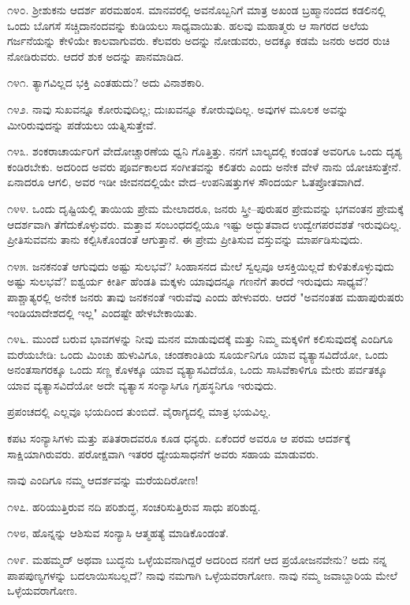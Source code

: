 ೧೪೦. ಶ‍್ರೀಶುಕನು ಆದರ್ಶ ಪರಮಹಂಸ. ಮಾನವರಲ್ಲಿ ಅವನೊಬ್ಬನಿಗೆ ಮಾತ್ರ ಅಖಂಡ ಬ್ರಹ್ಮಾನಂದದ ಕಡಲಿನಲ್ಲಿ ಒಂದು ಬೊಗಸೆ ಸಚ್ಚಿದಾನಂದವನ್ನು ಕುಡಿಯಲು ಸಾಧ್ಯವಾಯಿತು. ಹಲವು ಮಹಾತ್ಮರು ಆ ಸಾಗರದ ಅಲೆಯ ಗರ್ಜನೆಯನ್ನು ಕೇಳಿಯೇ ಕಾಲವಾಗುವರು. ಕೆಲವರು ಅದನ್ನು ನೋಡುವರು, ಅದಕ್ಕೂ ಕಡಮೆ ಜನರು ಅದರ ರುಚಿ ನೋಡಿರುವರು. ಆದರೆ ಶುಕ ಅದನ್ನು ಪಾನಮಾಡಿದ.

೧೪೧. ತ್ಯಾಗವಿಲ್ಲದ ಭಕ್ತಿ ಎಂತಹುದು? ಅದು ವಿನಾಶಕಾರಿ.

೧೪೨. ನಾವು ಸುಖವನ್ನೂ ಕೋರುವುದಿಲ್ಲ; ದುಃಖವನ್ನೂ ಕೋರುವುದಿಲ್ಲ. ಅವುಗಳ ಮೂಲಕ ಅವನ್ನು ಮೀರಿರುವುದನ್ನು ಪಡೆಯಲು ಯತ್ನಿಸುತ್ತೇವೆ.

೧೪೩. ಶಂಕರಾಚಾರ್ಯರಿಗೆ ವೇದೋಚ್ಚಾರಣೆಯ ಧ್ವನಿ ಗೊತ್ತಿತ್ತು. ನನಗೆ ಬಾಲ್ಯದಲ್ಲಿ ಕಂಡಂತೆ ಅವರಿಗೂ ಒಂದು ದೃಶ್ಯ ಕಂಡಿರಬೇಕು. ಅದರಿಂದ ಅವರು ಪೂರ್ವಕಾಲದ ಸಂಗೀತವನ್ನು ಕಲಿತರು ಎಂದು ಅನೇಕ ವೇಳೆ ನಾನು ಯೋಚಿಸುತ್ತೇನೆ. ಏನಾದರೂ ಆಗಲಿ, ಅವರ ಇಡೀ ಜೀವನದಲ್ಲಿಯೇ ವೇದ–ಉಪನಿಷತ್ತುಗಳ ಸೌಂದರ್ಯ ಓತಪ್ರೋತವಾಗಿದೆ.

೧೪೪. ಒಂದು ದೃಷ್ಟಿಯಲ್ಲಿ ತಾಯಿಯ ಪ್ರೇಮ ಮೇಲಾದರೂ, ಜನರು ಸ್ತ್ರೀ–ಪುರುಷರ ಪ್ರೇಮವನ್ನು ಭಗವಂತನ ಪ್ರೇಮಕ್ಕೆ ಆದರ್ಶವಾಗಿ ತೆಗೆದುಕೊಳ್ಳುವರು. ಮತ್ತಾವ ಸಂಬಂಧದಲ್ಲಿಯೂ ಇಷ್ಟು ಅದ್ಭುತವಾದ ಉದ್ವೇಗಪರವಶತೆ ಇರುವುದಿಲ್ಲ. ಪ್ರೀತಿಸುವವನು ತಾನು ಕಲ್ಪಿಸಿಕೊಂಡಂತೆ ಆಗುತ್ತಾನೆ. ಈ ಪ್ರೇಮ ಪ್ರೀತಿಸುವ ವಸ್ತುವನ್ನು ಮಾರ್ಪಡಿಸುವುದು.

೧೪೫. ಜನಕನಂತೆ ಆಗುವುದು ಅಷ್ಟು ಸುಲಭವೆ? ಸಿಂಹಾಸನದ ಮೇಲೆ ಸ್ವಲ್ಪವೂ ಆಸಕ್ತಿಯಿಲ್ಲದೆ ಕುಳಿತುಕೊಳ್ಳುವುದು ಅಷ್ಟು ಸುಲಭವೆ? ಐಶ್ವರ್ಯ ಕೀರ್ತಿ ಹೆಂಡತಿ ಮಕ್ಕಳು ಯಾವುದನ್ನೂ ಗಣನೆಗೆ ತಾರದೆ ಇರುವುದು ಸಾಧ್ಯವೆ? ಪಾಶ್ಚಾತ್ಯರಲ್ಲಿ ಅನೇಕ ಜನರು ತಾವು ಜನಕನಂತೆ ಇರುವೆವು ಎಂದು ಹೇಳುವರು. ಆದರೆ "ಅವನಂತಹ ಮಹಾಪುರುಷರು ಇಂಡಿಯಾದೇಶದಲ್ಲಿ ಇಲ್ಲ" ಎಂದಷ್ಟೇ ಹೇಳಬೇಕಾಯಿತು.

೧೪೬. ಮುಂದೆ ಬರುವ ಭಾವಗಳನ್ನು ನೀವು ಮನನ ಮಾಡುವುದಕ್ಕೆ ಮತ್ತು ನಿಮ್ಮ ಮಕ್ಕಳಿಗೆ ಕಲಿಸುವುದಕ್ಕೆ ಎಂದಿಗೂ ಮರೆಯಬೇಡಿ: ಒಂದು ಮಿಂಚು ಹುಳುವಿಗೂ, ಚಂಡಕಾಂತಿಯ ಸೂರ್ಯನಿಗೂ ಯಾವ ವ್ಯತ್ಯಾಸವಿದೆಯೋ, ಒಂದು ಅನಂತಸಾಗರಕ್ಕೂ ಒಂದು ಸಣ್ಣ ಕೊಳಕ್ಕೂ ಯಾವ ವ್ಯತ್ಯಾಸವಿದೆಯೊ, ಒಂದು ಸಾಸಿವೆಕಾಳಿಗೂ ಮೇರು ಪರ್ವತಕ್ಕೂ ಯಾವ ವ್ಯತ್ಯಾಸವಿದೆಯೋ ಅದೇ ವ್ಯತ್ಯಾಸ ಸಂನ್ಯಾಸಿಗೂ ಗೃಹಸ್ಥನಿಗೂ ಇರುವುದು.

ಪ್ರಪಂಚದಲ್ಲಿ ಎಲ್ಲವೂ ಭಯದಿಂದ ತುಂಬಿದೆ. ವೈರಾಗ್ಯದಲ್ಲಿ ಮಾತ್ರ ಭಯವಿಲ್ಲ.

ಕಪಟ ಸಂನ್ಯಾಸಿಗಳು ಮತ್ತು ಪತಿತರಾದವರೂ ಕೂಡ ಧನ್ಯರು. ಏಕೆಂದರೆ ಅವರೂ ಆ ಪರಮ ಆದರ್ಶಕ್ಕೆ ಸಾಕ್ಷಿಯಾಗಿರುವರು. ಪರೋಕ್ಷವಾಗಿ ಇತರರ ಧ್ಯೇಯಸಾಧನೆಗೆ ಅವರು ಸಹಾಯ ಮಾಡುವರು.

ನಾವು ಎಂದಿಗೂ ನಮ್ಮ ಆದರ್ಶವನ್ನು ಮರೆಯದಿರೋಣ!

೧೪೭. ಹರಿಯುತ್ತಿರುವ ನದಿ ಪರಿಶುದ್ಧ, ಸಂಚರಿಸುತ್ತಿರುವ ಸಾಧು ಪರಿಶುದ್ದ.

೧೪೮, ಹೊನ್ನನ್ನು ಆಶಿಸುವ ಸಂನ್ಯಾಸಿ ಆತ್ಮಹತ್ಯೆ ಮಾಡಿಕೊಂಡಂತೆ.

೧೪೯. ಮಹಮ್ಮದ್ ಅಥವಾ ಬುದ್ಧನು ಒಳ್ಳೆಯವನಾಗಿದ್ದರೆ ಅದರಿಂದ ನನಗೆ ಆದ ಪ್ರಯೋಜನವೇನು? ಅದು ನನ್ನ ಪಾಪಪುಣ್ಯಗಳನ್ನು ಬದಲಾಯಿಸಬಲ್ಲದೆ? ನಾವು ನಮಗಾಗಿ ಒಳ್ಳೆಯವರಾಗೋಣ. ನಾವು ನಮ್ಮ ಜವಾಬ್ದಾರಿಯ ಮೇಲೆ ಒಳ್ಳೆಯವರಾಗೋಣ.

